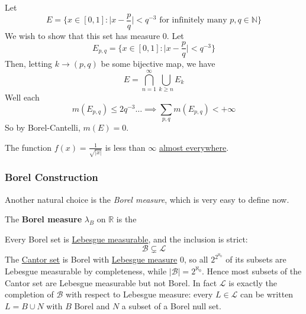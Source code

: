   \begin{example}
    \label{ex:practice-problem}
    Let 
    \begin{equation}
      E = \{x \in [0, 1] \colon \Big| x - \frac{p}{q} \Big| < q^{-3} \text{ for infinitely many } p, q \in \mathbb{N} \}
    \end{equation}
    We wish to show that this set has measure $0$. Let 
    \begin{equation}
      E_{p, q} = \{x \in [0, 1] \colon \Big| x - \frac{p}{q} \Big| < q^{-3} \}
    \end{equation}
    Then, letting $k \to (p, q)$ be some bijective map, we have 
    \begin{equation}
      E = \bigcap_{n=1}^\infty \bigcup_{k \geq n} E_k
    \end{equation}
    Well each 
    \begin{equation}
      m(E_{p, q}) \leq 2 q^{-3} \ldots \implies \sum_{p, q} m(E_{p, q}) < + \infty
    \end{equation}
    So by Borel-Cantelli, $m(E) = 0$. 
  \end{example}

  \begin{example}
    \label{ex:rational-function}
    The function $f(x) = \frac{1}{\sqrt{|x|}}$ is less than $\infty$ \hyperref[def:almost_everywhere]{almost everywhere}. 
  \end{example}

\subsubsection{Borel Construction}

	Another natural choice is the \textit{Borel measure}, which is very easy to define now. 

	\begin{definition}
	  \label{def:borel-measure}
		The \textbf{Borel measure} $\lambda_B$ on $\mathbb{R}$ is the 
	\end{definition}

	\begin{lemma}
	  \label{thm:lebesgue-sigma-algebra-is-slightly-bigger}
		Every Borel set is \hyperref[def:lebesgue-measurable-set]{Lebesgue measurable}, and the inclusion is strict:
		\begin{equation}
		  \mathcal{B} \subsetneq \mathcal{L}
		\end{equation}
		The \hyperref[ex:cantor-set-is-measurable]{Cantor set} is Borel with \hyperref[def:lebesgue-measure]{Lebesgue measure} $0$, so all $2^{2^{\aleph_0}}$ of its subsets are Lebesgue measurable by completeness, while $|\mathcal{B}| = 2^{\aleph_0}$. Hence most subsets of the Cantor set are Lebesgue measurable but not Borel. In fact $\mathcal{L}$ is exactly the completion of $\mathcal{B}$ with respect to Lebesgue measure: every $L \in \mathcal{L}$ can be written $L = B \cup N$ with $B$ Borel and $N$ a subset of a Borel null set. 
	\end{lemma}

